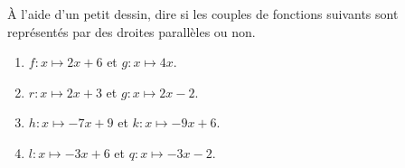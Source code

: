 
\begin{exercice}\label{exosmath-0491}

    À l'aide d'un petit dessin, dire si les couples de fonctions suivants sont représentés par des droites parallèles ou non.
    \begin{enumerate}
        \item
            \( f\colon x\mapsto 2x+6\) et \( g\colon x\mapsto 4x\).
        \item
            \( r\colon x\mapsto 2x+3\) et \( g\colon x\mapsto 2x-2\).
        \item
            \( h\colon x\mapsto -7x+9\) et \( k\colon x\mapsto -9x+6\).
        \item
            \( l\colon x\mapsto -3x+6\) et \( q\colon x\mapsto -3x-2\).
    \end{enumerate}

\end{exercice}
